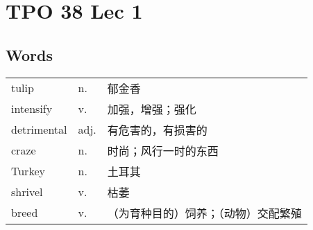 \section{TPO 38 Lec 1}

\subsection{Words}

\begin{tabular}{lll}
    tulip       & n.   & 郁金香                \\
    intensify   & v.   & 加强，增强；强化           \\
    detrimental & adj. & 有危害的，有损害的          \\
    craze       & n.   & 时尚；风行一时的东西         \\
    Turkey      & n.   & 土耳其                \\
    shrivel     & v.   & 枯萎                 \\
    breed       & v.   & （为育种目的）饲养；（动物）交配繁殖 \\
\end{tabular}

